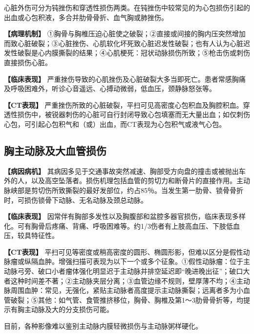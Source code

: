 心脏外伤可分为钝挫伤和穿透性损伤两类。在钝挫伤中较常见的为心包损伤引起的出血或心包积液，多合并肋骨骨折、血气胸或肺挫伤。

\textbf{【病理机制】}
①胸骨与胸椎压迫心脏使之破裂；②直接或间接的胸内压突然增加而致心脏破裂；③心脏挫伤、心肌软化坏死致心脏迟发性破裂；也有人认为心脏迟发性破裂是心内膜撕裂的结果；④心肌梗死：冠状动脉损伤所致；⑤枪击伤或刺伤直接损伤心脏。

\textbf{【临床表现】}
严重挫伤导致的心肌挫伤及心脏破裂大多当即死亡。患者常感胸痛及呼吸困难外，听诊心音遥远、心搏动微弱，低血压，颈静脉怒张等。

\textbf{【CT表现】}
严重挫伤所致的心脏破裂，平扫可见高密度心包积血及胸腔积血。穿透性损伤中，被锐器刺伤的心脏可自行封闭导致心包填塞而无大量出血；如仅刺伤心包，可引起心包积气和（或）出血，而CT表现为心包积气或液气心包。

\subsection{胸主动脉及大血管损伤}

\textbf{【病因病机】}
其病因多见于交通事故突然减速、胸部受方向盘的撞击或被抛出车外的人，以及高空坠落者。损伤机理包括血管的剪切力和断骨片的直接作用。主动脉峡部是剪切伤所致撕裂的最好发部位，约占85％。当发生第一肋骨、锁骨骨折时，可损伤锁骨下动脉、无名动脉及颈总动脉。

\textbf{【临床表现】}
因常伴有胸部多发性以及胸腹部和盆腔多器官损伤，临床表现多样化。可有胸骨后疼痛、背痛、呼吸困难等。约1/3伤者有上肢高血压、下肢低血压，较具特征性。

\textbf{【CT表现】}
平扫可见等密度或稍高密度的圆形、椭圆形影，但难以区分是假性动脉瘤或纵隔血肿。增强扫描可表现为以下一个或多个征象。①假性动脉瘤：位于主动脉弓旁、破口小者瘤体强化明显迟于主动脉并排空延迟即“晚进晚出征”；破口大者这种时间差不著；②主动脉夹层分离；③血管边缘不规则，壁厚薄不均；④主动脉周围血肿：常见，无强化，紧贴主动脉者高度提示主动脉撕裂；远离者多为小血管破裂；⑤其他：如气管、食管推挤移位，胸骨、胸椎及第1～3肋骨骨折等，均提示有胸主动脉及大的分支损伤可能。

目前，各种影像难以鉴别主动脉内膜轻微损伤与主动脉粥样硬化。

\protect\hypertarget{text00018.html}{}{}

